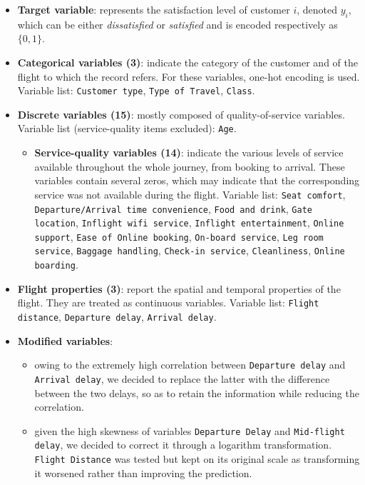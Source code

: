 \begin{itemize}
\item \textbf{Target variable}: represents the satisfaction level of customer $i$,
denoted $y_i$, which can be either \emph{dissatisfied} or \emph{satisfied} and is
encoded respectively as $\{0,1\}$.

\item \textbf{Categorical variables (3)}: indicate the category of the customer
and of the flight to which the record refers. For these variables, one-hot
encoding is used. Variable list: \texttt{Customer type}, \texttt{Type of Travel},
\texttt{Class}.

\item \textbf{Discrete variables (15)}: mostly composed of quality-of-service
variables. Variable list (service-quality items excluded): \texttt{Age}.
  \begin{itemize}
  \item \textbf{Service-quality variables (14)}: indicate the various levels of
  service available throughout the whole journey, from booking to arrival. These
  variables contain several zeros, which may indicate that the corresponding
  service was not available during the flight. Variable list: \texttt{Seat
  comfort}, \texttt{Departure/Arrival time convenience}, \texttt{Food and drink},
  \texttt{Gate location}, \texttt{Inflight wifi service}, \texttt{Inflight
  entertainment}, \texttt{Online support}, \texttt{Ease of Online booking},
  \texttt{On-board service}, \texttt{Leg room service}, \texttt{Baggage handling},
  \texttt{Check-in service}, \texttt{Cleanliness}, \texttt{Online boarding}.
  \end{itemize}

\item \textbf{Flight properties (3)}: report the spatial and temporal properties
of the flight. They are treated as continuous variables. Variable list:
\texttt{Flight distance}, \texttt{Departure delay}, \texttt{Arrival delay}.

\item \textbf{Modified variables}:
  \begin{itemize}
  \item owing to the extremely high correlation between \texttt{Departure delay}
  and \texttt{Arrival delay}, we decided to replace the latter with the
  difference between the two delays, so as to retain the information while
  reducing the correlation.
  \item given the high skewness of variables \texttt{Departure Delay} and
  \texttt{Mid-flight delay}, we decided to correct it through a logarithm
  transformation. \texttt{Flight Distance} was tested but kept on its original
  scale as transforming it worsened rather than improving the prediction.
  \end{itemize}
\end{itemize}

